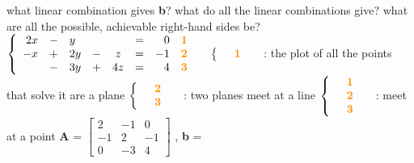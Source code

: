\documentclass[12pt, a4paper]{article}
\begin{document}
what linear combination gives {\bf{b}}?
\newline
what do all the linear combinations give?
\newline
what are all the possible, achievable right-hand sides be?
\vspace{14pt}
\newline
\begin{math}
\left\{  
\begin{array}{rclrclrclrcl}
	2x & - & y & & & = & 0 &{\bf{\textcolor{anhao-orange}{1}}}&\\
	-x & + & 2y & - & z & = & -1 &{\bf{\textcolor{anhao-orange}{2}}}&\\
	& -& 3y & + & 4z & = & 4 &{\bf{\textcolor{anhao-orange}{3}}}&
\end{array}  
\right.
\end{math}
\newline
\begin{math}
\left\{  
\begin{array}{rcl}
	&{\bf{\textcolor{anhao-orange}{1}}}&
\end{array}  
\right.
\end{math}
\quad : the plot of all the points that solve it are a plane
\newline
\begin{math}
\left\{  
\begin{array}{rcl}
	&{\bf{\textcolor{anhao-orange}{2}}}& \\
	&{\bf{\textcolor{anhao-orange}{3}}}&
\end{array}  
\right.
\end{math}
\quad : two planes meet at a line
\newline
\begin{math}
\left\{  
\begin{array}{rcl}
	&{\bf{\textcolor{anhao-orange}{1}}}& \\
	&{\bf{\textcolor{anhao-orange}{2}}}& \\
	&{\bf{\textcolor{anhao-orange}{3}}}&
\end{array}  
\right.
\end{math}
\quad : meet at a point
\newline
{\bf{A}} = 
\begin{math}
\begin{bmatrix}
	2  & -1 & 0 \\
	-1 & 2 & -1 \\
	0 & -3 & 4
\end{bmatrix}
\end{math}
, {\bf{b}} =
\end{document}
